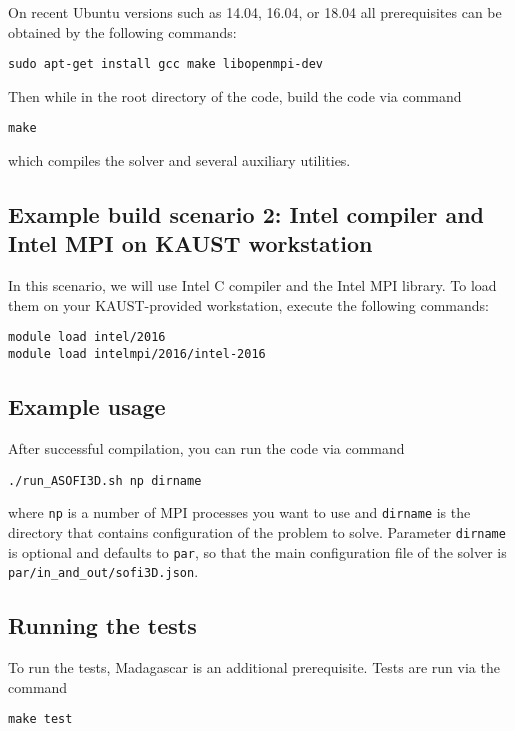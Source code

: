 On recent Ubuntu versions such as 14.04, 16.04, or 18.04 all
prerequisites can be obtained by the following commands:

\begin{verbatim}
sudo apt-get install gcc make libopenmpi-dev
\end{verbatim}

Then while in the root directory of the code, build the code via command

\begin{verbatim}
make
\end{verbatim}

which compiles the solver and several auxiliary utilities.

\subsection{Example build scenario 2: Intel compiler and Intel MPI on
KAUST
workstation}\label{example-build-scenario-2-intel-compiler-and-intel-mpi-on-kaust-workstation}

In this scenario, we will use Intel C compiler and the Intel MPI
library. To load them on your KAUST-provided workstation, execute the
following commands:

\begin{verbatim}
module load intel/2016
module load intelmpi/2016/intel-2016
\end{verbatim}

\subsection{Example usage}\label{example-usage}

After successful compilation, you can run the code via command

\begin{verbatim}
./run_ASOFI3D.sh np dirname
\end{verbatim}

where \texttt{np} is a number of MPI processes you want to use and
\texttt{dirname} is the directory that contains configuration of the
problem to solve. Parameter \texttt{dirname} is optional and defaults to
\texttt{par}, so that the main configuration file of the solver is
\texttt{par/in\_and\_out/sofi3D.json}.

\subsection{Running the tests}\label{running-the-tests}

To run the tests, Madagascar is an additional prerequisite. Tests are
run via the command

\begin{verbatim}
make test
\end{verbatim}
